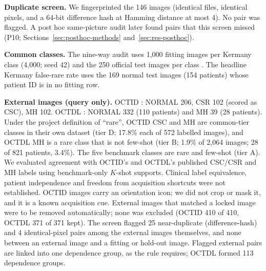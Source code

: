 \documentclass[conference]{IEEEtran}
\begin{document}
\textbf{Duplicate screen.} We fingerprinted the 146 images (identical files, identical pixels, and a 64-bit difference hash at Hamming distance at most 4). No pair was flagged. A post hoc same-picture audit later found pairs that this screen missed (P10; Sections~\ref{sec:posthoc-methods} and~\ref{sec:res-posthoc}).

\textbf{Common classes.} The nine-way audit uses 1,000 fitting images per Kermany class (4,000; seed 42) and the 250 official test images per class \cite{Kermany2018}. The headline Kermany false-rare rate uses the 169 normal test images (154 patients) whose patient ID is in no fitting row.

\textbf{External images (query only).} OCTID \cite{OCTID2020}: NORMAL 206, CSR 102 (scored as CSC), MH 102. OCTDL \cite{OCTDL2024}: NORMAL 332 (110 patients) and MH 39 (28 patients). Under the project definition of ``rare'', OCTID CSC and MH are common-tier classes in their own dataset (tier D; 17.8\% each of 572 labelled images), and OCTDL MH is a rare class that is not few-shot (tier B; 1.9\% of 2,064 images; 28 of 821 patients, 3.4\%). The five benchmark classes are rare and few-shot (tier A).
We evaluated agreement with OCTID's and OCTDL's published CSC/CSR and MH labels using benchmark-only $K$-shot supports. Clinical label equivalence, patient independence and freedom from acquisition shortcuts were not established.
OCTID images carry an orientation icon; we did not crop or mask it, and it is a known acquisition cue. External images that matched a locked image were to be removed automatically; none was excluded (OCTID 410 of 410, OCTDL 371 of 371 kept). The screen flagged 25 near-duplicate (difference-hash) and 4 identical-pixel pairs among the external images themselves, and none between an external image and a fitting or hold-out image. Flagged external pairs are linked into one dependence group, as the rule requires; OCTDL formed 113 dependence groups.
\end{document}
